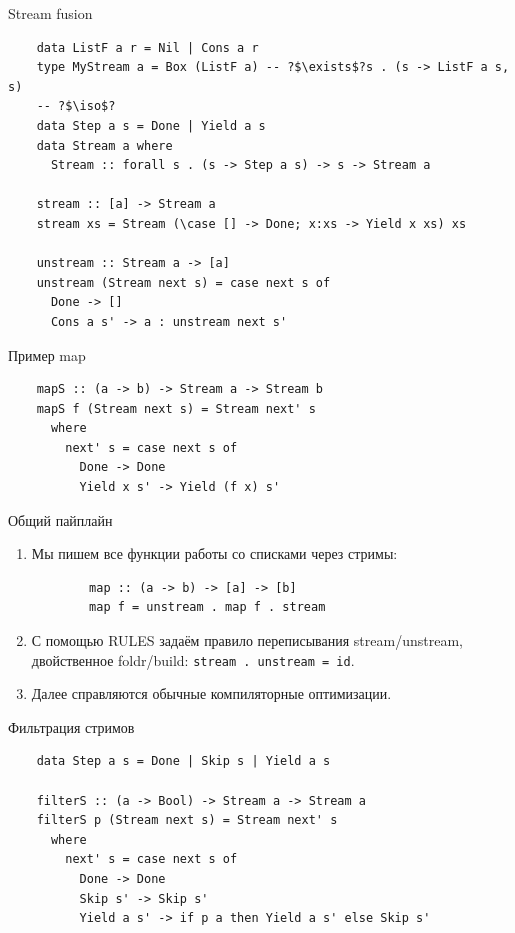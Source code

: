     \begin{frame}[fragile]{Stream fusion}
        \pause
        \begin{verbatim}
    data ListF a r = Nil | Cons a r
    type MyStream a = Box (ListF a) -- ?$\exists$?s . (s -> ListF a s, s)
    -- ?$\iso$?
    data Step a s = Done | Yield a s
    data Stream a where
      Stream :: forall s . (s -> Step a s) -> s -> Stream a

    stream :: [a] -> Stream a
    stream xs = Stream (\case [] -> Done; x:xs -> Yield x xs) xs

    unstream :: Stream a -> [a]
    unstream (Stream next s) = case next s of
      Done -> []
      Cons a s' -> a : unstream next s'
        \end{verbatim}
    \end{frame}

    \begin{frame}[fragile]{Пример map}
        \begin{verbatim}
    mapS :: (a -> b) -> Stream a -> Stream b
    mapS f (Stream next s) = Stream next' s
      where
        next' s = case next s of
          Done -> Done
          Yield x s' -> Yield (f x) s'
        \end{verbatim}
    \end{frame}

    \begin{frame}[fragile]{Общий пайплайн}
        \pause
        \begin{enumerate}
            \item Мы пишем все функции работы со списками через стримы:
            \begin{verbatim}
        map :: (a -> b) -> [a] -> [b]
        map f = unstream . map f . stream
            \end{verbatim}
            \item С помощью RULES задаём правило переписывания stream/unstream, двойственное foldr/build: \texttt{stream . unstream = id}.
            \item Далее справляются обычные компиляторные оптимизации.
        \end{enumerate}
    \end{frame}

    \begin{frame}[fragile]{Фильтрация стримов}
        \begin{verbatim}
    data Step a s = Done | Skip s | Yield a s

    filterS :: (a -> Bool) -> Stream a -> Stream a
    filterS p (Stream next s) = Stream next' s
      where
        next' s = case next s of
          Done -> Done
          Skip s' -> Skip s'
          Yield a s' -> if p a then Yield a s' else Skip s'
        \end{verbatim}
    \end{frame}

